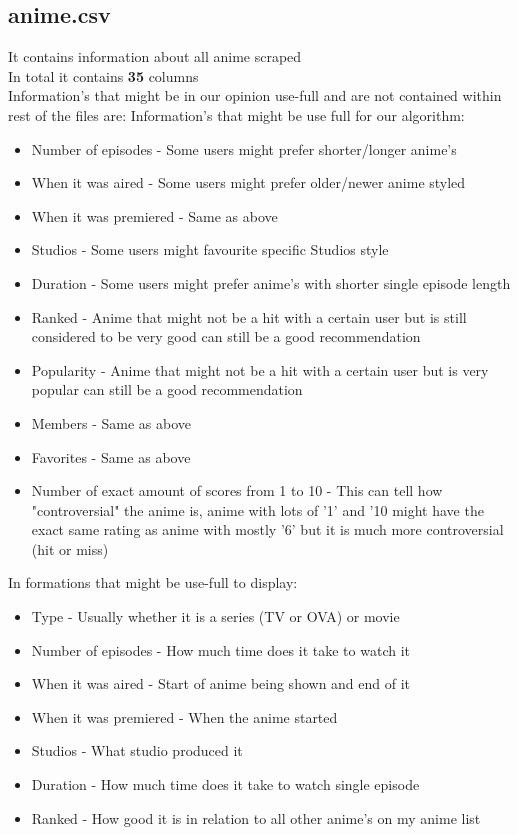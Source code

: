 \subsection{anime.csv}
It contains information about all anime scraped \\ 
In total it contains \textbf{35} columns \\ 
Information's that might be in our opinion use-full and are not contained within rest of the files are:
Information's that might be use full for our algorithm:
\begin{itemize}
\item Number of episodes - Some users might prefer shorter/longer anime's
\item When it was aired - Some users might prefer older/newer anime styled
\item When it was premiered - Same as above
\item Studios - Some users might favourite specific Studios style
\item Duration  - Some users might prefer anime's with shorter single episode length
\item Ranked - Anime that might not be a hit with a certain user but is still considered to be very good can still be a good recommendation
\item Popularity - Anime that might not be a hit with a certain user but is very popular can still be a good recommendation
\item Members - Same as above
\item Favorites - Same as above
\item Number of exact amount of scores from 1 to 10 - This can tell how "controversial" the anime is, anime with lots of '1' and '10 might have the exact same rating as anime with mostly '6' but it is much more controversial (hit or miss)
\end{itemize}

In formations that might be use-full to display:
\begin{itemize}
\item Type - Usually whether it is a series (TV or OVA) or movie
\item Number of episodes - How much time does it take to watch it
\item When it was aired - Start of anime being shown and end of it
\item When it was premiered - When the anime started
\item Studios - What studio produced it
\item Duration - How much time does it take to watch single episode
\item Ranked - How good it is in relation to all other anime's on my anime list
\end{itemize}
